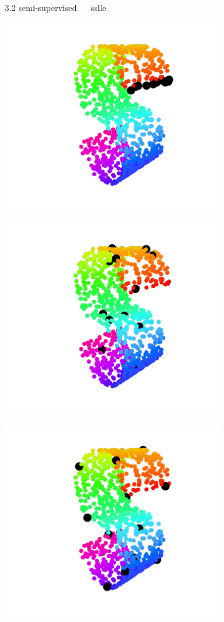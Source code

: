 \documentclass[11pt, compress, t, notes = noshow, xcolor = table, 
aspectratio = 1610]{beamer}
\begin{document}
\begin{frame}{\textcolor{gray!90}{3.2 semi-supervised} ~~ sslle}
\begin{minipage}[t]{0.2\textwidth}
  \includegraphics[trim = 80 20 60 0, clip, %
      width = 0.7\textwidth]{figures/s-curve-pp-poor}
\end{minipage}%
\begin{minipage}[t]{0.2\textwidth}
  \includegraphics[trim = 80 20 60 0, clip, %
      width = 0.7\textwidth]{figures/s-curve-pp-random}
\end{minipage}%
\begin{minipage}[t]{0.2\textwidth}
    \includegraphics[trim = 80 20 60 0, clip, %
    width = 0.7\textwidth]{figures/s-curve-pp-maxmin}
\end{minipage}


\end{frame}
\end{document}
